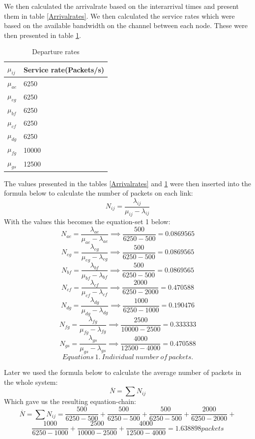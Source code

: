 \documentclass{article}
\begin{document}
We then calculated the arrivalrate based on the interarrival times and present them in table \ref{Arrivalrates}. We then calculated the service rates which were based on the available bandwidth on the channel between each node. These were then presented in table \ref{departurerates}.
\begin{table}[h]
\centering
\label{departurerates}
\caption{Departure rates}
\begin{tabular}{|l|l|}
\hline
$\mu_{ij}$ & Service rate(Packets/s)\\ \hline
$\mu_{ae}$ & 6250 \\ \hline
$\mu_{eg}$ & 6250 \\ \hline
$\mu_{bf}$ & 6250 \\ \hline
$\mu_{cf}$ & 6250 \\ \hline
$\mu_{dg}$ & 6250 \\ \hline
$\mu_{fg}$ & 10000 \\ \hline
$\mu_{gs}$ & 12500 \\ \hline
\end{tabular}
\end{table}
The values presented in the tables \ref{Arrivalrates} and \ref{departurerates} were then inserted into the
formula below to calculate the number of packets on each link:
$$N_{ij} = \frac{\lambda_{ij}}{\mu_{ij} - \lambda_{ij} }$$
With the values this becomes the equation-set 1 below:
$$N_{ae} = \frac{\lambda_{ae}}{\mu_{ae} - \lambda_{ae} } \implies \frac{500}{6250 - 500 } = 0.0869565 $$
$$N_{eg} = \frac{\lambda_{eg}}{\mu_{eg} - \lambda_{eg} } \implies \frac{500}{6250 - 500 } = 0.0869565 $$
$$N_{bf} = \frac{\lambda_{bf}}{\mu_{bf} - \lambda_{bf} } \implies \frac{500}{6250 - 500 } = 0.0869565 $$
$$N_{cf} = \frac{\lambda_{cf}}{\mu_{cf} - \lambda_{cf} } \implies \frac{2000}{6250 - 2000 } = 0.470588 $$
$$N_{dg} = \frac{\lambda_{dg}}{\mu_{dg} - \lambda_{dg} } \implies \frac{1000}{6250 - 1000 } = 0.190476 $$
$$N_{fg} = \frac{\lambda_{fg}}{\mu_{fg} - \lambda_{fg} } \implies \frac{2500}{10000 - 2500 } = 0.333333 $$
$$N_{gs} = \frac{\lambda_{gs}}{\mu_{gs} - \lambda_{gs} } \implies \frac{4000}{12500 - 4000 } = 0.470588 $$
$$Equations\ 1.\ Individual\ number\ of\ packets.$$

Later we used the formula below to calculate the average number of packets in the whole system:
$$ \overline{N} = \sum N_{ij} $$
Which gave us the resulting equation-chain:
$$ \overline{N} = \sum N_{ij} = \frac{500}{6250 - 500 } + \frac{500}{6250 - 500 } + \frac{500}{6250 - 500 } + \frac{2000}{6250 - 2000 } + $$ 
$$ \frac{1000}{6250 - 1000 } + \frac{2500}{10000 - 2500 } + \frac{4000}{12500 - 4000 } = 1.638898 packets $$ 
\end{document}
